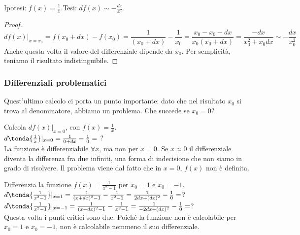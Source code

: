\noindent Ipotesi: $f(x)=\frac{1}{x}$.\tab Tesi: $df(x)\sim-\frac{dx}{x^2}$.

\begin{proof}
\[
 df(x)|_{x=x_0}= f(x_0+dx)-f(x_0)=\frac{1}{(x_0+dx)}-\frac{1}{x_0}=
 \frac{x_0-x_0-dx}{x_0(x_0+dx)}=\frac{-dx}{x_0^2+x_0dx}\sim-\frac{dx}{x_0^2}
\]
Anche questa volta il valore del differenziale dipende da $x_0$. 
Per semplicità, teniamo il risultato indistinguibile.
\end{proof}

\subsubsection{Differenziali problematici}
\label{subsubsec:diff01_diffproblemi}

Quest'ultimo calcolo ci porta un punto importante: dato che nel risultato
$x_0$ si trova al denominatore, abbiamo un problema. Che succede se $x_0=0$?
\begin{esempio}
 Calcola $df(x)|_{x=0}$, con $f(x)=\frac{1}{x}$.\\
 $d\tonda{\frac{1}{x}}|_{x=0}=\frac{1}{0+dx}-\frac{1}{0}=$ ?\\
 La funzione è differenziabile $\forall x$, ma non per $x=0$. Se $x\approx 0$
 il differenziale diventa la differenza fra due infiniti, una forma di 
 indecisione che non siamo in grado di risolvere. Il problema viene dal fatto 
 che in $x=0$, $f(x)$ non è definita.
\end{esempio}

\begin{esempio}
Differenzia la funzione $f(x)=\frac{1}{x^2-1}$ per $x_0=1$ e $x_0=-1$.\\
$d\tonda{\frac{1}{x^2-1}}|_{x=1}=\frac{1}{(x+dx)^2-1}-\frac{1}{x^2-1}=
\frac{1}{2dx+(dx)^2}-\frac{1}{0}=$?\\
$d\tonda{\frac{1}{x^2-1}}|_{x=-1}=\frac{1}{(x+dx)^2-1}-\frac{1}{x^2-1}=
\frac{1}{-2dx+(dx)^2}-\frac{1}{0}=$?\\
Questa volta i punti critici sono due. Poiché la funzione non è calcolabile
per $x_0=1$ e $x_0=-1$, non è calcolabile nemmeno il suo differenziale.
\end{esempio}

